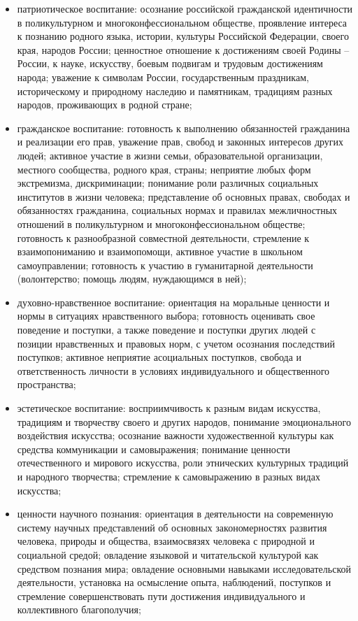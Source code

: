 \documentclass[
  11pt,
  russian,
]{book}
\begin{document}
\begin{itemize}
\item
  патриотическое воспитание: осознание российской гражданской идентичности в поликультурном и многоконфессиональном обществе, проявление интереса к познанию родного языка, истории, культуры Российской Федерации, своего края, народов России; ценностное отношение к достижениям своей Родины -- России, к науке, искусству, боевым подвигам и трудовым достижениям народа; уважение к символам России, государственным праздникам, историческому и природному наследию и памятникам, традициям разных народов, проживающих в родной стране;
\item
  гражданское воспитание: готовность к выполнению обязанностей гражданина и реализации его прав, уважение прав, свобод и законных интересов других людей; активное участие в жизни семьи, образовательной организации, местного сообщества, родного края, страны; неприятие любых форм экстремизма, дискриминации; понимание роли различных социальных институтов в жизни человека; представление об основных правах, свободах и обязанностях гражданина, социальных нормах и правилах межличностных отношений в поликультурном и многоконфессиональном обществе; готовность к разнообразной совместной деятельности, стремление к взаимопониманию и взаимопомощи, активное участие в школьном самоуправлении; готовность к участию в гуманитарной деятельности (волонтерство; помощь людям, нуждающимся в ней);
\item
  духовно-нравственное воспитание: ориентация на моральные ценности и нормы в ситуациях нравственного выбора; готовность оценивать свое поведение и поступки, а также поведение и поступки других людей с позиции нравственных и правовых норм, с учетом осознания последствий поступков; активное неприятие асоциальных поступков, свобода и ответственность личности в условиях индивидуального и общественного пространства;
\item
  эстетическое воспитание: восприимчивость к разным видам искусства, традициям и творчеству своего и других народов, понимание эмоционального воздействия искусства; осознание важности художественной культуры как средства коммуникации и самовыражения; понимание ценности отечественного и мирового искусства, роли этнических культурных традиций и народного творчества; стремление к самовыражению в разных видах искусства;
\item
  ценности научного познания: ориентация в деятельности на современную систему научных представлений об основных закономерностях развития человека, природы и общества, взаимосвязях человека с природной и социальной средой; овладение языковой и читательской культурой как средством познания мира; овладение основными навыками исследовательской деятельности, установка на осмысление опыта, наблюдений, поступков и стремление совершенствовать пути достижения индивидуального и коллективного благополучия;

\end{itemize}
\end{document}
